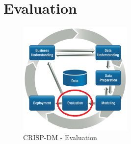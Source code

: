 \chapter{Evaluation}

\begin{figure}[hbtp]
	\centering
	\includegraphics[width=0.5\textwidth]{./images/CRISPDM_5.png}
	\caption{CRISP-DM - Evaluation}
	\label{CRISPDM_5}
\end{figure}


